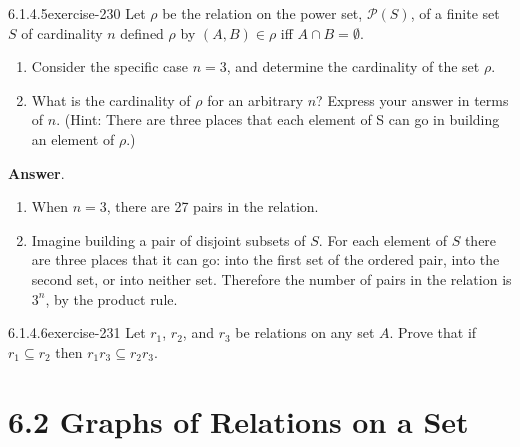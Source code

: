 \documentclass[twoside,10pt,]{book}
\numberwithin{equation}{section}
\begin{document}
\begin{divisionsolution}{6.1.4.5}{}{exercise-230}%
\hypertarget{p-1976}{}%
Let \(\rho\) be the relation on the power set, \(\mathcal{P}(S )\), of a finite set \(S\) of cardinality \(n\) defined \(\rho\) by \((A,B)
\in \rho\) iff \(A\cap  B = \emptyset\).%
\par
\hypertarget{p-1977}{}%
\leavevmode%
\begin{enumerate}[label=(\alph*)]
\item\hypertarget{li-1055}{}\hypertarget{p-1978}{}%
Consider the specific case \(n = 3\), and determine the cardinality of the set \(\rho\).%
\item\hypertarget{li-1056}{}\hypertarget{p-1979}{}%
What is the cardinality of \(\rho\) for an arbitrary \(n\)? Express your answer in terms of \(n\). (Hint: There are three places that each element of S can go in building an element of \(\rho\).)%
\end{enumerate}
%
\par\smallskip%
\noindent\textbf{Answer}.\quad%
\hypertarget{p-1980}{}%
\leavevmode%
\begin{enumerate}[label=(\alph*)]
\item\hypertarget{li-1057}{}\hypertarget{p-1981}{}%
When \(n=3\), there are 27 pairs in the relation.%
\item\hypertarget{li-1058}{}\hypertarget{p-1982}{}%
Imagine building a pair of disjoint subsets of \(S\). For each element of \(S\) there are three places that it can go: into the first set of the ordered pair, into the second set, or into neither set. Therefore the number of pairs in the relation is \(3^n\), by the product rule.%
\end{enumerate}
%
\end{divisionsolution}%
\begin{divisionsolution}{6.1.4.6}{}{exercise-231}%
\hypertarget{p-1983}{}%
Let \(r_1\), \(r_2\), and \(r_3\) be relations on any set \(A\). Prove that if \(r_1\subseteq r_2\) then \(r_1r_3\subseteq r_2r_3\).%
\end{divisionsolution}%
\section*{6.2 Graphs of Relations on a Set}
\end{document}
